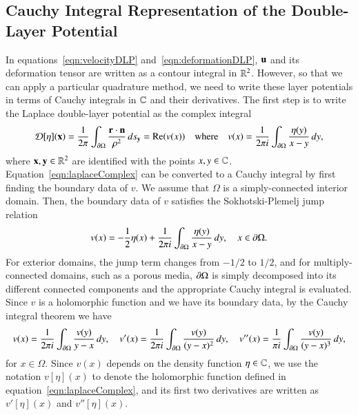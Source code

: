 \documentclass[preprint, 10pt]{elsarticle}
\begin{document}
\subsection{Cauchy Integral Representation of the Double-Layer
Potential}
\label{sec:DLPcomplex}
In equations~\eqref{eqn:velocityDLP} and~\eqref{eqn:deformationDLP},
${\mathbf{u}}$ and its deformation tensor are written as a contour integral in
${\mathbb{R}}^2$.  However, so that we can apply a particular quadrature method,
we need to write these layer potentials in terms of Cauchy integrals in
${\mathbb{C}}$ and their derivatives.  The first step is to write the Laplace
double-layer potential as the complex integral
\begin{align}
  {\mathcal{D}}[\eta]({\mathbf{x}}) = \frac{1}{2\pi} \int_{{\partial}\Omega} 
    \frac{{\mathbf{r}} \cdot {\mathbf{n}}}{\rho^2}\, ds_{\mathbf{y}} = {\operatorname{Re}} (v(x)) \quad 
    \text{where} \quad v(x) = \frac{1}{2\pi i} \int_{{\partial}\Omega}
    \frac{\eta(y)}{x - y} \, dy,
  \label{eqn:laplaceComplex}
\end{align}
where ${\mathbf{x}},{\mathbf{y}} \in {\mathbb{R}}^2$ are identified with the points $x,y \in {\mathbb{C}}$.
Equation~\eqref{eqn:laplaceComplex} can be converted to a Cauchy
integral by first finding the boundary data of $v$.  We assume that
$\Omega$ is a simply-connected interior domain. Then, the boundary data
of $v$ satisfies the Sokhotski-Plemelj jump relation
\begin{align}
  \label{eqn:SPrelation}
  v(x) = - \frac{1}{2} \eta(x) + \frac{1}{2\pi i} \int_{{\partial}\Omega}
    \frac{\eta(y)}{x-y}\, dy, \quad x \in {\partial}\Omega.
\end{align}
For exterior domains, the jump term changes from $-1/2$ to $1/2$, and
for multiply-connected domains, such as a porous media, ${\partial}\Omega$ is
simply decomposed into its different connected components and the
appropriate Cauchy integral is evaluated.  Since $v$ is a holomorphic
function and we have its boundary data, by the Cauchy integral theorem
we have
\begin{align}
  \label{eqn:cauchy}
  v(x) = \frac{1}{2\pi i}\int_{{\partial}\Omega} 
    \frac{v(y)}{y-x} \,dy, \quad
  v'(x) = \frac{1}{2\pi i} \int_{{\partial}\Omega}
    \frac{v(y)}{(y-x)^2} \, dy, \quad
  v''(x) = \frac{1}{\pi i} \int_{{\partial}\Omega}
    \frac{v(y)}{(y-x)^3} \, dy,
\end{align}
for $x \in \Omega$.  Since $v(x)$ depends on the density function $\eta
\in {\mathbb{C}}$, we use the notation $v[\eta](x)$ to denote the holomorphic
function defined in equation~\eqref{eqn:laplaceComplex}, and its first
two derivatives are written as $v'[\eta](x)$ and $v''[\eta](x)$.  
  
\end{document}
